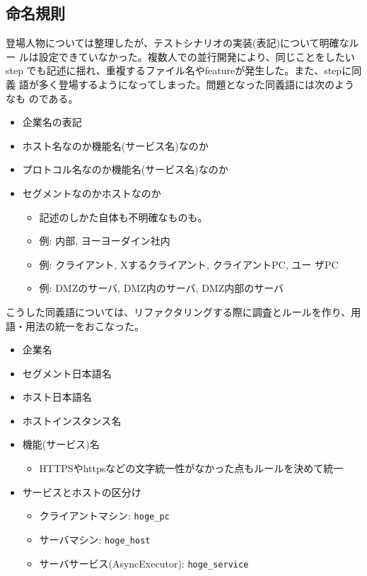 \subsection{命名規則}
登場人物については整理したが、テストシナリオの実装(表記)について明確なルー
ルは設定できていなかった。複数人での並行開発により、同じことをしたいstep
でも記述に揺れ、重複するファイル名やfeatureが発生した。また、stepに同義
語が多く登場するようになってしまった。問題となった同義語には次のようなも
のである。
\begin{itemize}
 \item 企業名の表記
 \item ホスト名なのか機能名(サービス名)なのか
 \item プロトコル名なのか機能名(サービス名)なのか
 \item セグメントなのかホストなのか
       \begin{itemize}
        \item 記述のしかた自体も不明確なものも。
        \item 例: 内部, ヨーヨーダイン社内
        \item 例: クライアント, Xするクライアント, クライアントPC, ユー
              ザPC
        \item 例: DMZのサーバ, DMZ内のサーバ, DMZ内部のサーバ
       \end{itemize}
\end{itemize}
こうした同義語については、リファクタリングする際に調査とルールを作り、用
語・用法の統一をおこなった。
\begin{itemize}
 \item 企業名
 \item セグメント日本語名
 \item ホスト日本語名
 \item ホストインスタンス名
 \item 機能(サービス)名
       \begin{itemize}
        \item HTTPSやhttpsなどの文字統一性がなかった点もルールを決めて統一
       \end{itemize}
 \item サービスとホストの区分け
       \begin{itemize}
        \item クライアントマシン: \verb|hoge_pc|
        \item サーバマシン: \verb|hoge_host|
        \item サーバサービス(AsyncExecutor): \verb|hoge_service|
       \end{itemize}
\end{itemize}

